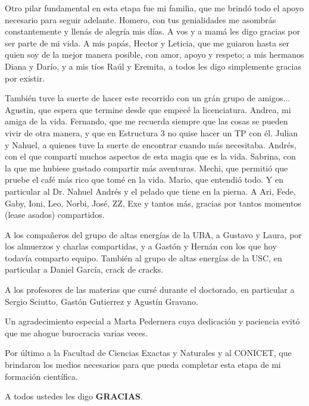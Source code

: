 Otro pilar fundamental en esta etapa fue mi familia, que me brind\'o todo el apoyo necesario para seguir adelante.
Homero, con tus genialidades me asombr\'as constantemente y llen\'as de alegr\'ia mis d\'ias. A vos y a mam\'a les digo gracias por ser parte de mi vida.
A mis pap\'as, Hector y Leticia, que me guiaron hasta ser quien soy de la mejor manera posible, con amor, apoyo y respeto; a mis hermanos Diana y Dar\'io, y a mis t\'ios Ra\'ul y Eremita, a todos les digo simplemente gracias por existir.

Tambi\'en tuve la suerte de hacer este recorrido con un gr\'an grupo de amigos...
Agustin, que espera que termine desde que empec\'e la licenciatura.
Andrea, mi amiga de la vida.
Fernando, que me recuerda siempre que las cosas se pueden vivir de otra manera, y que en Estructura 3 no quise hacer un TP con \'el.
Julian y Nahuel, a quienes tuve la suerte de encontrar cuando m\'as necesitaba.
Andr\'es, con el que compart\'i muchos aspectos de esta magia que es la vida.
Sabrina, con la que me hubiese gustado compartir m\'as aventuras.
Mechi, que permiti\'o que pruebe el caf\'e m\'as rico que tom\'e en la vida.
Mario, que entendi\'o todo.
Y en particular al Dr. Nahuel Andr\'es y el pelado que tiene en la pierna.
A Ari, Fede, Gaby, Ioni, Leo, Norbi, Jos\'e, ZZ, Exe y tantos m\'as, gracias por tantos momentos (lease asados) compartidos.

A los compa\~neros del grupo de altas energ\'ias de la UBA, a Gustavo y Laura, por los almuerzos y charlas compartidas, y a Gast\'on y Hern\'an con los que hoy todav\'ia comparto equipo.
Tambi\'en al grupo de altas energ\'ias de la USC, en particular a Daniel Garc\'ia, crack de cracks. 

A los profesores de las materias que curs\'e durante el doctorado, en particular a Sergio Sciutto, Gast\'on Gutierrez y Agust\'in Gravano.

Un agradecimiento especial a Marta Pedernera cuya dedicaci\'on y paciencia evit\'o que me ahogue burocracia varias veces.

Por \'ultimo a la Facultad de Ciencias Exactas y Naturales y al CONICET, que brindaron los medios necesarios para que pueda completar esta etapa de mi formaci\'on cient\'ifica.

\vspace{1cm}
A todos ustedes les digo \textbf{GRACIAS}.